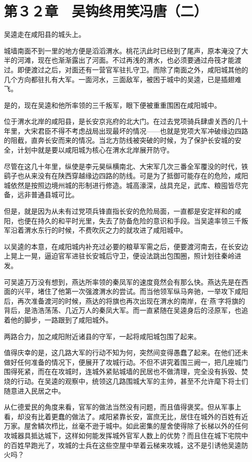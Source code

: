 \section{第３２章　吴钩终用笑冯唐（二）}

吴逵走在咸阳县的城头上。

城墙南面不到一里的地方便是滔滔渭水。桃花汛此时已经到了尾声，原本淹没了大半的河滩，现在也渐渐露出了河面。不过再浅的渭水，也必须要通过舟筏才能渡过。即便渡过之后，对面还有一营官军驻扎守卫。而除了南面之外，咸阳城其他的几个方向都驻扎有大军。一面河水，三面敌军，被困于城中的吴逵，已是插翅难飞。

是的，现在吴逵和他所率领的三千叛军，眼下便被重重围困在咸阳城中。

位于渭水北岸的咸阳县，是长安京兆府的北大门。在过去党项骑兵肆虐关西的几十年里，大宋君臣不得不考虑战局出现最坏的情况——也就是党项大军冲破缘边四路的阻截，直奔长安而来的情况。当北方防线被突破的时候，为了保护长安城的安全，计划中就是要以咸阳城为核心在渭水北岸展开防守。

尽管在这几十年里，纵使是李元昊纵横南北、大宋军几次三番全军覆没的时代，铁鹞子也从来没有在陕西穿越缘边四路的防线。可是为了抵御可能存在的危险，咸阳城依然是按照边境州城的形制进行修造。城高濠深，战具充足，武库、粮囤皆尽完备，远非普通县城可比。

但是，就是因为从未有过党项兵锋直指长安的危险局面，一直都是安定祥和的咸阳，也便在持久的和平时光里，失去了防备危险的意识和手段。当吴逵率领三千叛军沿着渭水东行的时候，不费吹灰之力的就攻进了咸阳城中。

以吴逵的本意，在咸阳城内补充过必要的粮草军需之后，便要渡河南去，在长安边上晃上一晃，逼迫官军进驻长安城后守卫，便设法跳出包围圈，照计划往秦岭进发。

可吴逵万万没有想到，燕达所率领的秦凤军的速度竟然会有那么快。燕达先是在西面的兴平，堵住了他第一次强渡渭水的尝试。而当他领军纵马奔驰，一举攻下咸阳后，再次准备渡河的时候，燕达的将旗也再次出现在渭水的南岸，在‘燕’字将旗的背后，是浩浩荡荡、几近万人的秦凤大军。而一直紧随在吴逵身后的泾原军，也追着他的脚步，一路跟到了咸阳城外。

两路合力，加之咸阳附近诸县的守军，一起将咸阳城包围了起来。

值得庆幸的是，这几路大军的行动不知为何，突然间变得愚蠢了起来。在他们还未做好任何准备的情况下，便展开了攻城行动。不但不讲究着围三阙一，把几座城门围得死紧，而在在攻城时，连城外紧贴城墙的民居也不做清理，完全没有拆毁、焚烧的行动。在吴逵的观察中，统领这几路围城大军的主帅，甚至不允许麾下将士们随意进入民居之中。

从仁德爱民的角度来看，官军的做法当然没有问题，而且值得褒奖。但从军事上看，却没有比着更蠢的做法了。咸阳紧靠长安，富庶无比，居住在城外的百姓有近万家。屋舍鳞次栉比，丝毫不逊于城中。如此密集的屋舍使得除了长梯以外的任何攻城器具抵达城下，这样如何能发挥城外官军人数上的优势？而且住在城下宅院中的百姓早跑光了，攻城的士兵在这些空屋中举着云梯来攻城，这不是引诱他吴逵防火吗？

